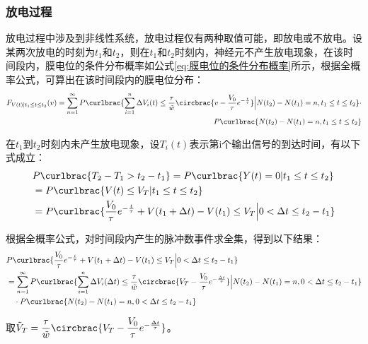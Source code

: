 \documentclass[11pt]{article}
\begin{document}
\subsubsection{放电过程}
放电过程中涉及到非线性系统，放电过程仅有两种取值可能，即放电或不放电。设某两次放电的时刻为$t_1$和$t_2$，则在$t_1$和$t_2$时刻内，神经元不产生放电现象，在该时间段内，膜电位的条件分布概率如公式\ref{eq:膜电位的条件分布概率}所示，根据全概率公式，可算出在该时间段内的膜电位分布：
\begin{align}
  \begin{aligned}
    F_{V(t)|t_1\le t\le t_2}(v)=    \sum_{n=1}^{\infty}P\curlbrac{\sum_{i=1}^{n}\Delta V_i(t)\le \frac{\tau}{\tilde{w}}\circbrac{v-\frac{V_0}{\tau}e^{-\frac{t}{\tau}}}\Big| N(t_2)-N(t_1)=n,t_1\le t\le t_2}\cdot \\
    P\curlbrac{ N(t_2)-N(t_1)=n,t_1\le t\le t_2}
  \end{aligned}
\end{align}\par
在$t_1$到$t_2$时刻内未产生放电现象，设$T_i(t)$表示第i个输出信号的到达时间，有以下式成立：
\begin{align*}
   & P\curlbrac{T_2-T_{1}>t_2-t_1}=P\curlbrac{Y(t)=0|t_1\le t\le t_2}                                                      \\
   & =  P\curlbrac{V(t)\le V_T|t_1\le t\le t_2}                                                                \\
   & = P\curlbrac{\frac{V_0}{\tau}e^{-\frac{t}{\tau}}+V(t_1+\Delta t)-V(t_1)\le V_T\Big|0<\Delta t\le t_2-t_1}
\end{align*}\par
根据全概率公式，对时间段内产生的脉冲数事件求全集，得到以下结果：
\begin{align}
  \begin{aligned}
     & P\curlbrac{\frac{V_0}{\tau}e^{-\frac{t}{\tau}}+V(t_1+\Delta t)-V(t_1)\le V_T\Big|0<\Delta t\le t_2-t_1} \\
     &=\sum_{n=1}^{\infty}P\curlbrac{\sum_{i=1}^{n}\Delta V_i(\Delta t)\le \frac{\tau}{\tilde{w}}\circbrac{V_T-\frac{V_0}{\tau}e^{-\frac{\Delta t}{\tau}}}\Big| N(t_2)-N(t_1)=n,0<\Delta t\le t_2-t_1}\\
     & \quad\cdot  P\curlbrac{ N(t_2)-N(t_1)=n,0<\Delta t\le t_2-t_1}                                                 
  \end{aligned}
  \label{eq:放电过程等价事件全集}
\end{align}\par
取$\displaystyle \tilde{V}_T= \frac{\tau}{\tilde{w}}\circbrac{V_T-\frac{V_0}{\tau}e^{-\frac{\Delta t}{\tau}}}$。
\end{document}
